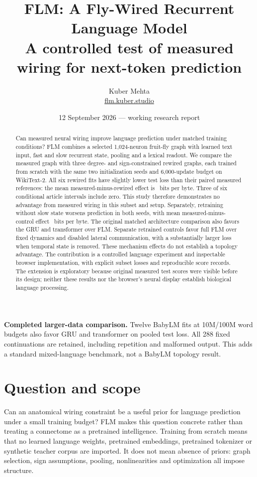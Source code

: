 \documentclass[10pt]{article}
\title{\textbf{FLM: A Fly-Wired Recurrent Language Model}\\[6pt]\large A controlled test of measured wiring for next-token prediction}
\author{Kuber Mehta\\\href{https://flm.kuber.studio}{flm.kuber.studio}}
\date{12 September 2026 --- working research report}
\begin{document}
\maketitle
\begin{abstract}
Can measured neural wiring improve language prediction under matched training conditions? FLM combines a selected 1,024-neuron fruit-fly graph with learned text input, fast and slow recurrent state, pooling and a lexical readout. We compare the measured graph with three degree- and sign-constrained rewired graphs, each trained from scratch with the same two initialization seeds and 6,000-update budget on WikiText-2. All six rewired fits have slightly lower test loss than their paired measured references: the mean measured-minus-rewired effect is \TopologyMeanDifference\ bits per byte. Three of six conditional article intervals include zero. This study therefore demonstrates no advantage from measured wiring in this subset and setup. Separately, retraining without slow state worsens prediction in both seeds, with mean measured-minus-control effect \SlowStateMeanDifference\ bits per byte. The original matched architecture comparison also favors the GRU and transformer over FLM. Separate retrained controls favor full FLM over fixed dynamics and disabled lateral communication, with a substantially larger loss when temporal state is removed. These mechanism effects do not establish a topology advantage. The contribution is a controlled language experiment and inspectable browser implementation, with explicit subset losses and reproducible score records. The extension is exploratory because original measured test scores were visible before its design; neither these results nor the browser's neural display establish biological language processing.
\end{abstract}

\textbf{Completed larger-data comparison.} Twelve BabyLM fits at 10M/100M
word budgets also favor GRU and transformer on pooled test loss. All 288 fixed
continuations are retained, including repetition and malformed output. This
adds a standard mixed-language benchmark, not a BabyLM topology result.

\section{Question and scope}
Can an anatomical wiring constraint be a useful prior for language prediction under a small training budget? FLM makes this question concrete rather than treating a connectome as a pretrained intelligence. Training from scratch means that no learned language weights, pretrained embeddings, pretrained tokenizer or synthetic teacher corpus are imported. It does not mean absence of priors: graph selection, sign assumptions, pooling, nonlinearities and optimization all impose structure.
\end{document}
